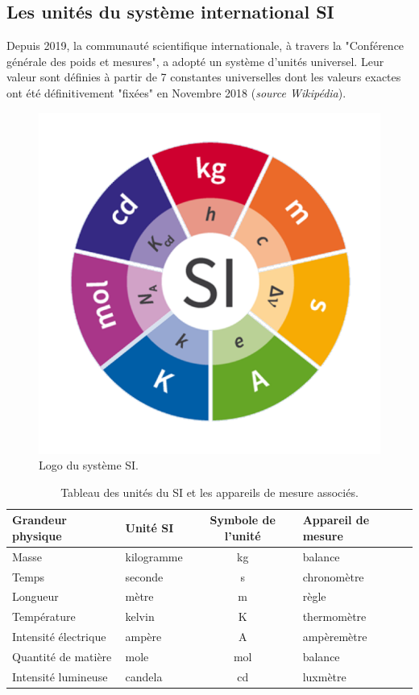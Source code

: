 \subsection{Les unités du système international SI}
Depuis 2019, la communauté scientifique internationale, à travers la "Conférence générale des poids et mesures", a adopté un système d'unités universel. Leur valeur sont définies à partir de 7 constantes universelles dont les valeurs exactes ont été définitivement "fixées" en Novembre 2018 (\textit{source Wikipédia}). 
\begin{figure}[!h]
    \centering\includegraphics[scale=0.4]{Images/Fiche_Methode1/SI_Logo_with_defining_constants.png}
    \caption{Logo du système SI. }
    \label{fig:Syteme_SI}
\end{figure}
\begin{table}[!h]
    \centering
    \begin{tabularx}{\textwidth}{| X | X | c | X |}  \hline
Grandeur physique & Unité SI & Symbole de l'unité & Appareil de mesure \\
\hline
Masse & kilogramme & kg & balance \\
Temps & seconde & s & chronomètre \\
Longueur & mètre & m & règle \\
Température & kelvin & K & thermomètre \\
Intensité électrique & ampère & A & ampèremètre \\
Quantité de matière & mole & mol & balance\\
Intensité lumineuse & candela & cd & luxmètre \\
\hline
\end{tabularx}
    \caption{Tableau des unités du SI et les appareils de mesure associés.}
    \label{tab:SI}
\end{table}
